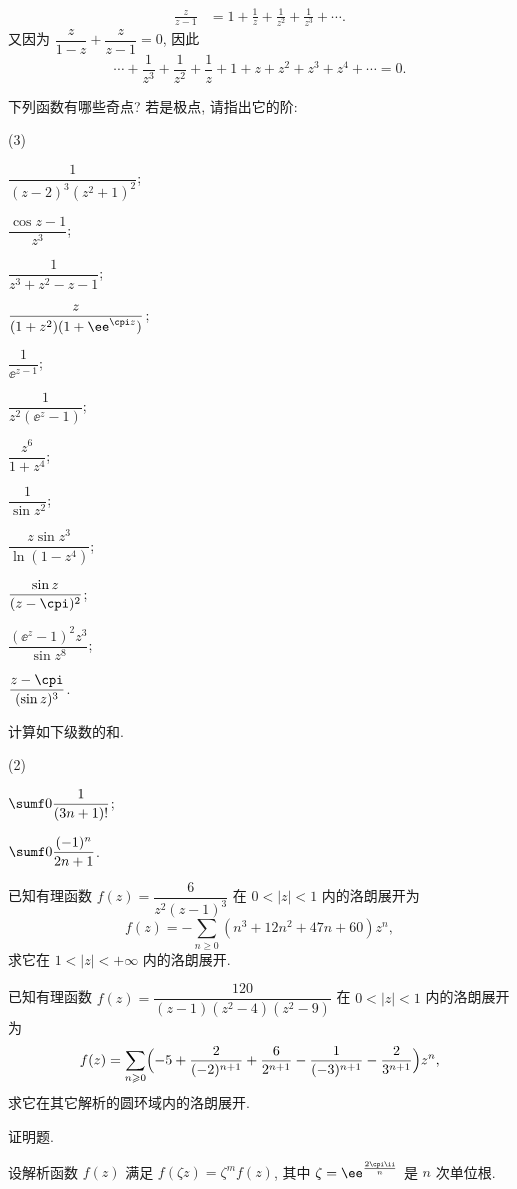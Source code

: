\begin{homework}
\begin{homework}
\begin{align*}
        \frac{z}{z-1}&=1+\frac1z+\frac1{z^2}+\frac1{z^3}+\cdots.
      \end{align*}
      又因为 $\dfrac{z}{1-z}+\dfrac{z}{z-1}=0$, 因此
      \[
        \cdots+\frac1{z^3}+\frac1{z^2}+\frac1z+1+z+z^2+z^3+z^4+\cdots=0.
      \]
    \item 下列函数有哪些奇点? 若是极点, 请指出它的阶:
      \begin{subhomework}(3)
        \item $\dfrac1{(z-2)^3(z^2+1)^2}$;
        \item $\dfrac{\cos z-1}{z^3}$;
        \item $\dfrac1{z^3+z^2-z-1}$;
        \item $\dfrac z{(1+z^2)(1+\ee^{\cpi z})}$;
        \item $\dfrac1{\ee^{z-1}}$;
        \item $\dfrac1{z^2(\ee^z-1)}$;
        \item $\dfrac{z^6}{1+z^4}$;
        \item $\dfrac1{\sin z^2}$;
        \item $\dfrac{z\sin z^3}{\ln(1-z^4)}$;
        \item $\dfrac{\sin z}{(z-\cpi)^2}$;
        \item $\dfrac{(\ee^z-1)^2z^3}{\sin z^8}$;
        \item $\dfrac{z-\cpi}{(\sin z)^3}$.
      \end{subhomework}
    \item \optionalex 计算如下级数的和.
    \begin{subhomework}(2)
      \item $\sumf0 \dfrac1{(3n+1)!}$;
      \item $\sumf0 \dfrac{(-1)^n}{2n+1}$.
    \end{subhomework}
    \item \optionalex 已知有理函数 $f(z)=\dfrac{6}{z^2(z-1)^3}$ 在 $0<|z|<1$ 内的洛朗展开为
      \[
        f(z)=-\sum_{n\ge 0}(n^3+12n^2+47n+60)z^n,
      \]
      求它在 $1<|z|<+\infty$ 内的洛朗展开.
    \item \optionalex 已知有理函数 $f(z)=\dfrac{120}{(z-1)(z^2-4)(z^2-9)}$ 在 $0<|z|<1$ 内的洛朗展开为
      \[
        f(z)=\sum_{n\ge 0}\Bigl(-5+\frac2{(-2)^{n+1}}+\frac6{2^{n+1}}-\frac1{(-3)^{n+1}}-\frac2{3^{n+1}}\Bigr)z^n,
      \]
      求它在其它解析的圆环域内的洛朗展开.
  \end{homework}
  \item 证明题.
  \begin{homework}
    \item 设解析函数 $f(z)$ 满足 $f(\zeta z)=\zeta^m f(z)$, 其中 $\zeta=\ee^{\frac{2\cpi\ii}n}$ 是 $n$ 次单位根.

\end{homework}
\end{homework}

